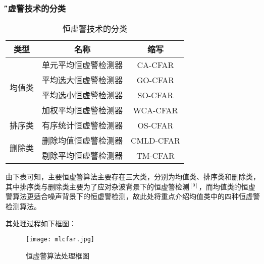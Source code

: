 \documentclass[12pt,a4paper]{article} %
\begin{document}
 	\subsubsection{\H 恒虚警技术的分类 } 
 	\begin{table}[h]
 	 \centering
 	 \caption{恒虚警技术的分类}
			\begin{tabular}{|c|c|c|}
			\hline
		类型 & 名称 & 缩写  \\
		\hline
		\multirow{4}{*}{均值类} & 单元平均恒虚警检测器 & CA-CFAR \\
		\cline{2-3}
		& 平均选大恒虚警检测器 &  GO-CFAR\\
		\cline{2-3}
		& 平均选小恒虚警检测器 &  SO-CFAR\\
		\cline{2-3}
		& 加权平均恒虚警检测器 &  WCA-CFAR\\
		\hline
		
		
		排序类&有序统计恒虚警检测器&OS-CFAR \\
		\hline
		\multirow{2}{*}{删除类} & 删除均值恒虚警检测器 & CMLD-CFAR  \\
		\cline{2-3}
		&剔除平均恒虚警检测器 &  TM-CFAR\\
		\hline
\end{tabular}
\end{table}
		由下表可知，主要恒虚警算法主要存在三大类，分别为均值类、排序类和删除类，其中排序类与删除类主要为了应对杂波背景下的恒虚警检测$^{[9]}$，而均值类的恒虚警算法更适合噪声背景下的恒虚警检测，故此处将重点介绍均值类中的四种恒虚警检测算法。
			 \par 其处理过程如下框图：
		\begin{figure}[!htp] %
 		  \centering
 		  \texttt{[image: mlcfar.jpg]} 
  		  \caption{恒虚警算法处理框图}
  		 \label{fig:1.1.1}
		\end{figure}
		
\end{document}
